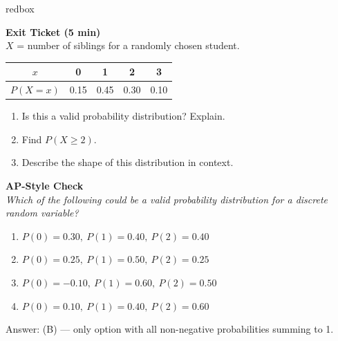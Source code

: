 \documentclass[10pt]{article}
\begin{document}
\begin{skillbox}{redbox}
\begin{minipage}[t]{0.48\linewidth}
    \textbf{Exit Ticket (5 min)}\\
    $X$ = number of siblings for a randomly chosen student.
    \begin{center}
    \small
    \renewcommand{\arraystretch}{1.3}
    \begin{tabular}{@{}ccccc@{}}
    $x$ & 0 & 1 & 2 & 3 \\
    \hline
    $P(X=x)$ & 0.15 & 0.45 & 0.30 & 0.10 \\
    \end{tabular}
    \end{center}
    \begin{enumerate}
        \item Is this a valid probability distribution? Explain.
        \item Find $P(X \ge 2)$.
        \item Describe the shape of this distribution in context.
    \end{enumerate}
\end{minipage}
\hfill
\begin{minipage}[t]{0.48\linewidth}
    \textbf{AP-Style Check}\\
    \textit{Which of the following could be a valid probability distribution for
    a discrete random variable?}
    \begin{enumerate}[label=(\Alph*)]
        \item $P(0)=0.30,\ P(1)=0.40,\ P(2)=0.40$
        \item $P(0)=0.25,\ P(1)=0.50,\ P(2)=0.25$
        \item $P(0)=-0.10,\ P(1)=0.60,\ P(2)=0.50$
        \item $P(0)=0.10,\ P(1)=0.40,\ P(2)=0.60$
    \end{enumerate}
    Answer: (B) --- only option with all non-negative probabilities summing to 1.
\end{minipage}
\end{skillbox}
\end{document}
